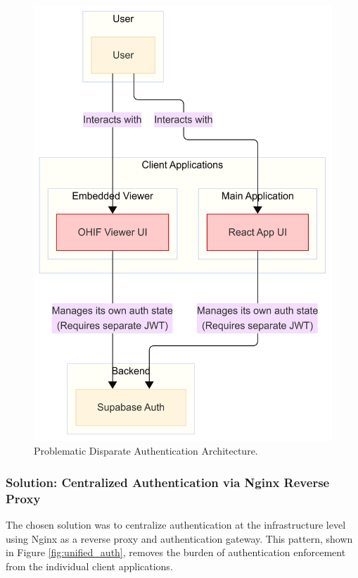 \begin{figure}[H]
    \centering
    \includegraphics[width=\textwidth]{content/resources/images/chap4-system-design/Problematic Disparate Authentication Architecture.png}
    \caption{Problematic Disparate Authentication Architecture.}
    \label{fig:disparate_auth}
\end{figure}

\subsubsection{Solution: Centralized Authentication via Nginx Reverse Proxy}
The chosen solution was to centralize authentication at the infrastructure level using Nginx as a reverse proxy and authentication gateway. This pattern, shown in Figure \ref{fig:unified_auth}, removes the burden of authentication enforcement from the individual client applications.


